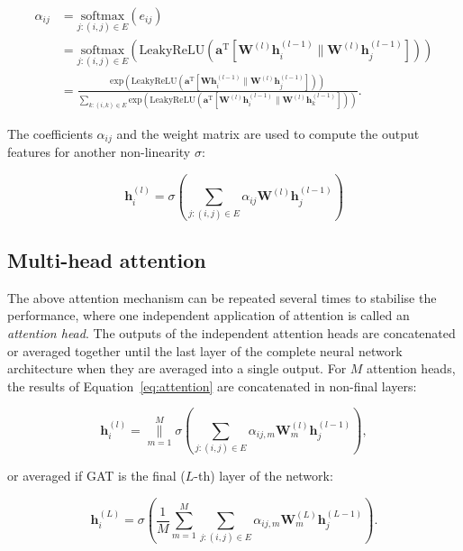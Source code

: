\begin{align}
    \alpha_{ij} &= \underset{{j: (i, j) \in E}}{\mathrm{softmax}}\left(e_{ij}\right) \\
    &= \underset{{j: (i, j) \in E}}{\mathrm{softmax}}\left(\mathrm{LeakyReLU}(\mathbf{a}^{\mathrm{T}}[\mathbf{W}^{(l)}\mathbf{h}_i^{(l-1)} \parallel \mathbf{W}^{(l)}\mathbf{h}_j^{(l-1)}])\right) \\
    &=  \frac{\mathrm{exp}\left(\mathrm{LeakyReLU}(\mathbf{a}^{\mathrm{T}}[\mathbf{W}\mathbf{h}_i^{(l-1)} \parallel \mathbf{W}^{(l)}\mathbf{h}_j^{(l-1)}])\right)}{\sum\limits_{k: (i, k) \in E}\mathrm{exp}\left(\mathrm{LeakyReLU}(\mathbf{a}^{\mathrm{T}}[\mathbf{W}^{(l)}\mathbf{h}_i^{(l-1)} \parallel \mathbf{W}^{(l)}\mathbf{h}_k^{(l-1)}])\right)}.
\end{align}

The coefficients $\alpha_{ij}$ and the weight matrix are used to compute the output features for another non-linearity $\sigma$:

\begin{equation}
    \label{eq:attention}
    \mathbf{h}_i^{(l)} = \sigma\left(\sum\limits_{j: (i, j) \in E} \alpha_{ij}\mathbf{W}^{(l)}\mathbf{h}_j^{(l-1)}\right)
\end{equation}

\subsection{Multi-head attention}
The above attention mechanism can be repeated several times to stabilise the performance, where one independent application of attention is called an \textit{attention head}. The outputs of the independent attention heads are concatenated or averaged together until the last layer of the complete neural network architecture when they are averaged into a single output. For $M$ attention heads, the results of Equation~\eqref{eq:attention} are concatenated in non-final layers:

\begin{equation}
    \mathbf{h}_i^{(l)} = \underset{m=1}{\overset{M}{\big\|}} \sigma\left(\sum\limits_{j: (i,j)\in E} \alpha_{ij, m}\mathbf{W}^{(l)}_m\mathbf{h}_j^{(l-1)}\right),
\end{equation}

or averaged if GAT is the final ($L$-th) layer of the network:

\begin{equation}
    \mathbf{h}_i^{(L)} = \sigma\left(\frac{1}{M}\sum\limits_{m=1}^M\sum\limits_{j: (i,j)\in E} \alpha_{ij, m}\mathbf{W}^{(L)}_m\mathbf{h}_j^{(L-1)}\right).
\end{equation}


